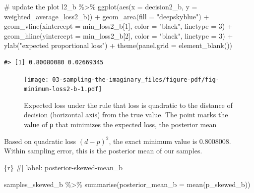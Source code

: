 \documentclass[
  letterpaper,
  DIV=11,
  numbers=noendperiod]{scrreprt}
\newenvironment{Shaded}{\begin{snugshade}}{\end{snugshade}}
\newcommand{\AttributeTok}[1]{\textcolor[rgb]{0.40,0.45,0.13}{#1}}
\newcommand{\CommentTok}[1]{\textcolor[rgb]{0.37,0.37,0.37}{#1}}
\newcommand{\DecValTok}[1]{\textcolor[rgb]{0.68,0.00,0.00}{#1}}
\newcommand{\FunctionTok}[1]{\textcolor[rgb]{0.28,0.35,0.67}{#1}}
\newcommand{\InformationTok}[1]{\textcolor[rgb]{0.37,0.37,0.37}{#1}}
\newcommand{\NormalTok}[1]{\textcolor[rgb]{0.00,0.23,0.31}{#1}}
\newcommand{\SpecialCharTok}[1]{\textcolor[rgb]{0.37,0.37,0.37}{#1}}
\newcommand{\StringTok}[1]{\textcolor[rgb]{0.13,0.47,0.30}{#1}}
\begin{document}
\begin{Shaded}
\begin{Highlighting}[]
\CommentTok{\# update the plot}
\NormalTok{l2\_b }\SpecialCharTok{\%\textgreater{}\%}   
  \FunctionTok{ggplot}\NormalTok{(}\FunctionTok{aes}\NormalTok{(}\AttributeTok{x =}\NormalTok{ decision2\_b, }\AttributeTok{y =}\NormalTok{ weighted\_average\_loss2\_b)) }\SpecialCharTok{+}
  \FunctionTok{geom\_area}\NormalTok{(}\AttributeTok{fill =} \StringTok{"deepskyblue"}\NormalTok{) }\SpecialCharTok{+}
  \FunctionTok{geom\_vline}\NormalTok{(}\AttributeTok{xintercept =}\NormalTok{ min\_loss2\_b[}\DecValTok{1}\NormalTok{], }\AttributeTok{color =} \StringTok{"black"}\NormalTok{, }\AttributeTok{linetype =} \DecValTok{3}\NormalTok{) }\SpecialCharTok{+}
  \FunctionTok{geom\_hline}\NormalTok{(}\AttributeTok{yintercept =}\NormalTok{ min\_loss2\_b[}\DecValTok{2}\NormalTok{], }\AttributeTok{color =} \StringTok{"black"}\NormalTok{, }\AttributeTok{linetype =} \DecValTok{3}\NormalTok{) }\SpecialCharTok{+}
  \FunctionTok{ylab}\NormalTok{(}\StringTok{"expected proportional loss"}\NormalTok{) }\SpecialCharTok{+}
  \FunctionTok{theme}\NormalTok{(}\AttributeTok{panel.grid =} \FunctionTok{element\_blank}\NormalTok{())}
\InformationTok{\textasciigrave{}\textasciigrave{}\textasciigrave{}}
\end{Highlighting}
\end{Shaded}

\begin{verbatim}
#> [1] 0.80080080 0.02669345
\end{verbatim}

\begin{figure}[H]

{\centering \texttt{[image: 03-sampling-the-imaginary\_files/figure-pdf/fig-minimum-loss2-b-1.pdf]}

}

\caption{\label{fig-minimum-loss2-b}Expected loss under the rule that
loss is quadratic to the distance of decision (horizontal axis) from the
true value. The point marks the value of \texttt{p} that minimizes the
expected loss, the posterior mean}

\end{figure}

Based on quadratic loss \((d−p)^{2}\), the exact minimum value is
0.8008008. Within sampling error, this is the posterior mean of our
samples.

\begin{Shaded}
\begin{Highlighting}[]
\InformationTok{\textasciigrave{}\textasciigrave{}\textasciigrave{}\{r\}}
\CommentTok{\#| label: posterior{-}skewed{-}mean\_b}

\NormalTok{samples\_skewed\_b }\SpecialCharTok{\%\textgreater{}\%} 
  \FunctionTok{summarise}\NormalTok{(}\AttributeTok{posterior\_mean\_b =} \FunctionTok{mean}\NormalTok{(p\_skewed\_b))}
\InformationTok{\textasciigrave{}\textasciigrave{}\textasciigrave{}}
\end{Highlighting}
\end{Shaded}
\end{document}
